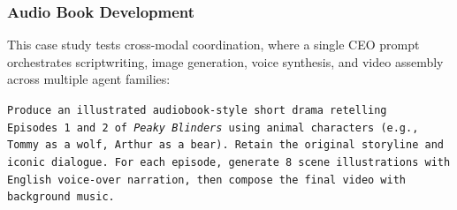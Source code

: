 \documentclass[11pt,a4paper]{article}
\begin{document}


\subsubsection{Audio Book Development}


This case study tests cross-modal coordination, where a single CEO prompt orchestrates scriptwriting, image generation, voice synthesis, and video assembly across multiple agent families:

\begin{mdframed}[
nobreak=true,
  linewidth=0.8pt,
  linecolor=black!40,
  backgroundcolor=black!2,
  innertopmargin=10pt,
  innerbottommargin=10pt,
  innerleftmargin=14pt,
  innerrightmargin=14pt,
  roundcorner=4pt
]
\sloppy
\noindent\texttt{Produce an illustrated audiobook-style short drama retelling Episodes~1 and~2 of \emph{Peaky Blinders} using animal characters (e.g., Tommy as a wolf, Arthur as a bear). Retain the original storyline and iconic dialogue. For each episode, generate 8 scene illustrations with English voice-over narration, then compose the final video with background music.}
\end{mdframed}
\end{document}
